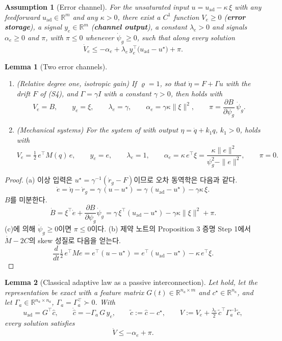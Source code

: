\documentclass[11pt]{article}\usepackage[margin=1in]{geometry}\usepackage{amsmath,amssymb,amsthm,mathtools}\usepackage{graphicx}\graphicspath{{figures/}{../figures/}{figs/}{./}}\usepackage{enumitem}\usepackage{hyperref}\usepackage{cleveref}\usepackage{tikz}\usetikzlibrary{arrows.meta,positioning,calc,shapes.geometric}\usepackage{float}\usepackage{rotating}\usepackage[most]{tcolorbox}\usepackage{kotex}\usepackage{booktabs}\emergencystretch=1.6em\tolerance=2000 \crefname{assumption}{Assumption}{Assumptions}\Crefname{assumption}{Assumption}{Assumptions}\crefname{definition}{Definition}{Definitions}\Crefname{definition}{Definition}{Definitions}\crefname{proposition}{Proposition}{Propositions}\Crefname{proposition}{Proposition}{Propositions}\crefname{fact}{Fact}{Facts}\Crefname{fact}{Fact}{Facts} \newtheorem{assumption}{Assumption}\newtheorem{definition}{Definition}\newtheorem{lemma}{Lemma}\newtheorem{proposition}{Proposition}\newtheorem{theorem}{Theorem}\newtheorem{corollary}{Corollary}\newtheorem{fact}{Fact}\theoremstyle{remark}\newtheorem{remark}{Remark} \newcommand{\R}{\mathbb{R}}\newcommand{\xb}{\bar x}\newcommand{\Ab}{\bar A}\newcommand{\By}{\bar B_y}\newcommand{\U}{\mathcal U}\newcommand{\Z}{\mathcal Z}
\begin{document}
\begin{assumption}[Error channel]
\label{ass:channel}
For the unsaturated input $u=u_{\mathrm{ad}}-\kappa\,\xi$ with any feedforward $u_{\mathrm{ad}}\in\R^m$ and any $\kappa>0$, there exist a $C^1$ function $V_e\ge0$ (\textbf{\emph{error storage}}), a signal $y_e\in\R^m$ (\textbf{\emph{channel output}}), a constant $\lambda_e>0$ and signals $\alpha_e\ge0$ and $\pi$, with $\pi\le0$ whenever $\dot\psi_g\ge0$, such that along every solution
\[
\dot V_e\le-\alpha_e+\lambda_e\,y_e^\top\big(u_{\mathrm{ad}}-u^\star\big)+\pi .
\]
\end{assumption}

\begin{lemma}[Two error channels]
\label{lem:channels}
\begin{enumerate}[label=(\alph*)]
\item (Relative degree one, isotropic gain) If $\varrho=1$, so that $\dot\eta=F+\Gamma u$ with the drift $F$ of (S4), and $\Gamma=\gamma I$ with a constant $\gamma>0$, then  holds with
\[
V_e=B,\qquad y_e=\xi,\qquad \lambda_e=\gamma,\qquad \alpha_e=\gamma\kappa\|\xi\|^2,\qquad \pi=\frac{\partial B}{\partial\psi_g}\,\dot\psi_g .
\]
\item (Mechanical systems) For the system of  with output $\eta=\dot q+k_1q$, $k_1>0$,  holds with
\[
V_e=\tfrac12\,e^\top M(q)\,e,\qquad y_e=e,\qquad \lambda_e=1,\qquad \alpha_e=\kappa\,e^\top\xi=\frac{\kappa\|e\|^2}{\psi_g^2-\|e\|^2},\qquad \pi=0 .
\]
\end{enumerate}
\end{lemma}

\begin{proof}
(a) 이상 입력은 $u^\star=\gamma^{-1}(\dot r_g-F)$이므로 오차 동역학은 다음과 같다.
\[
\dot e=\dot\eta-\dot r_g=\gamma\,(u-u^\star)=\gamma\,(u_{\mathrm{ad}}-u^\star)-\gamma\kappa\,\xi .
\]
$B$를 미분한다.
\[
\dot B=\xi^\top\dot e+\frac{\partial B}{\partial\psi_g}\dot\psi_g=\gamma\,\xi^\top(u_{\mathrm{ad}}-u^\star)-\gamma\kappa\|\xi\|^2+\pi .
\]
(c)에 의해 $\dot\psi_g\ge0$이면 $\pi\le0$이다. (b) 제약 노트의 Proposition 3 증명 Step 1에서 $\dot M-2C$의 skew 성질로 다음을 얻는다.
\[
\frac{d}{dt}\tfrac12\,e^\top Me=e^\top(u-u^\star)=e^\top(u_{\mathrm{ad}}-u^\star)-\kappa\,e^\top\xi .
\]
\end{proof}

\begin{lemma}[Classical adaptive law as a passive interconnection]
\label{lem:classical}
Let  hold, let the representation be exact with a feature matrix $G(t)\in\R^{n_a\times m}$ and $c^\star\in\R^{n_a}$, and let $\Gamma_a\in\R^{n_a\times n_a}$, $\Gamma_a=\Gamma_a^\top\succ0$. With
\[
u_{\mathrm{ad}}=G^\top\hat c,\qquad \dot{\hat c}=-\Gamma_a\,G\,y_e,\qquad \tilde c:=\hat c-c^\star,\qquad V:=V_e+\tfrac{\lambda_e}{2}\,\tilde c^\top\Gamma_a^{-1}\tilde c,
\]
every solution satisfies
\[
\dot V\le-\alpha_e+\pi .
\]
\end{lemma}
\end{document}
